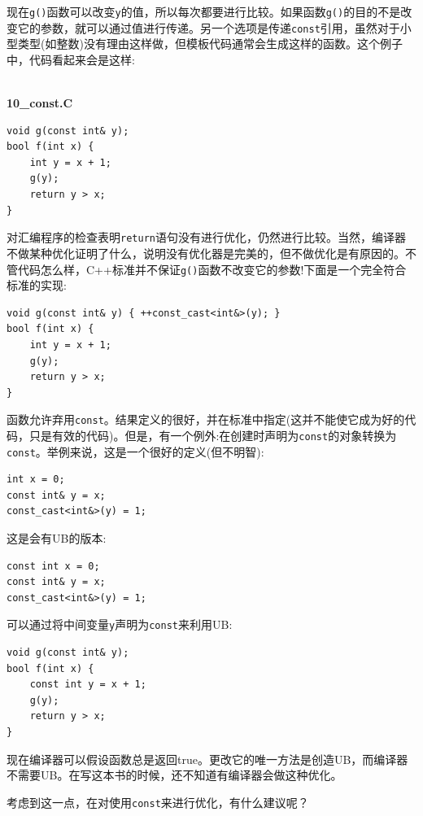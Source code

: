 现在\texttt{g()}函数可以改变\texttt{y}的值，所以每次都要进行比较。如果函数\texttt{g()}的目的不是改变它的参数，就可以通过值进行传递。另一个选项是传递\texttt{const}引用，虽然对于小型类型(如整数)没有理由这样做，但模板代码通常会生成这样的函数。这个例子中，代码看起来会是这样:

\hspace*{\fill} \\ %
\noindent
\textbf{10\_const.C}
\begin{lstlisting}[style=styleCXX]
void g(const int& y);
bool f(int x) {
	int y = x + 1;
	g(y);
	return y > x;
}
\end{lstlisting}

对汇编程序的检查表明\texttt{return}语句没有进行优化，仍然进行比较。当然，编译器不做某种优化证明了什么，说明没有优化器是完美的，但不做优化是有原因的。不管代码怎么样，C++标准并不保证\texttt{g()}函数不改变它的参数!下面是一个完全符合标准的实现:

\begin{lstlisting}[style=styleCXX]
void g(const int& y) { ++const_cast<int&>(y); }
bool f(int x) {
	int y = x + 1;
	g(y);
	return y > x;
}
\end{lstlisting}

函数允许弃用\texttt{const}。结果定义的很好，并在标准中指定(这并不能使它成为好的代码，只是有效的代码)。但是，有一个例外:在创建时声明为\texttt{const}的对象转换为\texttt{const}。举例来说，这是一个很好的定义(但不明智):

\begin{lstlisting}[style=styleCXX]
int x = 0;
const int& y = x;
const_cast<int&>(y) = 1;
\end{lstlisting}

这是会有UB的版本:

\begin{lstlisting}[style=styleCXX]
const int x = 0;
const int& y = x;
const_cast<int&>(y) = 1;
\end{lstlisting}

可以通过将中间变量\texttt{y}声明为\texttt{const}来利用UB:

\begin{lstlisting}[style=styleCXX]
void g(const int& y);
bool f(int x) {
	const int y = x + 1;
	g(y);
	return y > x;
}
\end{lstlisting}

现在编译器可以假设函数总是返回true。更改它的唯一方法是创造UB，而编译器不需要UB。在写这本书的时候，还不知道有编译器会做这种优化。

考虑到这一点，在对使用\texttt{const}来进行优化，有什么建议呢？

